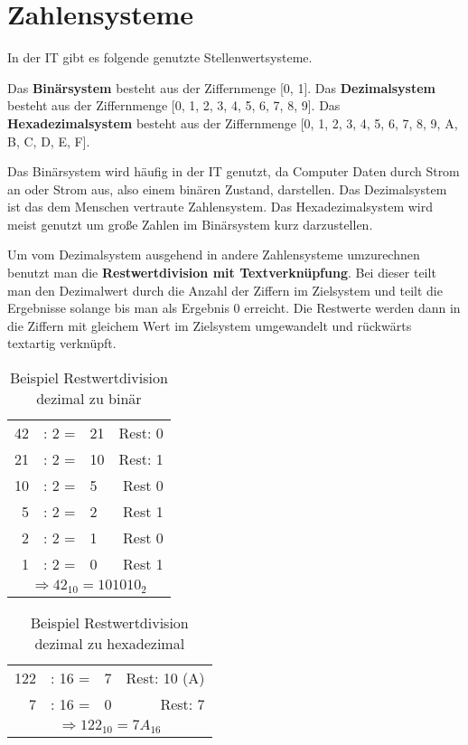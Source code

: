 \section{Zahlensysteme}

In der IT gibt es folgende genutzte Stellenwertsysteme.

Das \textbf{Binärsystem} besteht aus der Ziffernmenge [0, 1]. Das \textbf{Dezimalsystem} besteht aus der Ziffernmenge [0, 1, 2, 3, 4, 5, 6, 7, 8, 9]. Das \textbf{Hexadezimalsystem} besteht aus der Ziffernmenge [0, 1, 2, 3, 4, 5, 6, 7, 8, 9, A, B, C, D, E, F].

Das Binärsystem wird häufig in der IT genutzt, da Computer Daten durch Strom an oder Strom aus, also einem binären Zustand, darstellen. Das Dezimalsystem ist das dem Menschen vertraute Zahlensystem. Das Hexadezimalsystem wird meist genutzt um große Zahlen im Binärsystem kurz darzustellen.

Um vom Dezimalsystem ausgehend in andere Zahlensysteme umzurechnen benutzt man die \textbf{Restwertdivision mit Textverknüpfung}. Bei dieser teilt man den Dezimalwert durch die Anzahl der Ziffern im Zielsystem und teilt die Ergebnisse solange bis man als Ergebnis 0 erreicht. Die Restwerte werden dann in die Ziffern mit gleichem Wert im Zielsystem umgewandelt und rückwärts textartig verknüpft.

\begin{table} [H]
    \centering
    \begin{tabular}{rclr}
        42 & : 2 = & 21 & Rest: 0 \\
        21 & : 2 = & 10 & Rest: 1 \\
        10 & : 2 = & 5  & Rest 0  \\
        5  & : 2 = & 2  & Rest 1  \\
        2  & : 2 = & 1  & Rest 0  \\
        1  & : 2 = & 0  & Rest 1  \\\hline
        \multicolumn{4}{c}{$\Rightarrow 42_{10} = 101010_2$}
    \end{tabular}
    \caption{Beispiel Restwertdivision dezimal zu binär}
\end{table}

\begin{table}
    [H]
    \centering
    \begin{tabular}{rclr}
        122 & : 16 = & 7 & Rest: 10 (A) \\
        7   & : 16 = & 0 & Rest: 7      \\\hline
        \multicolumn{4}{c}{$\Rightarrow 122_{10} = 7A_{16}$}
    \end{tabular}
    \caption{Beispiel Restwertdivision dezimal zu hexadezimal}
\end{table}

